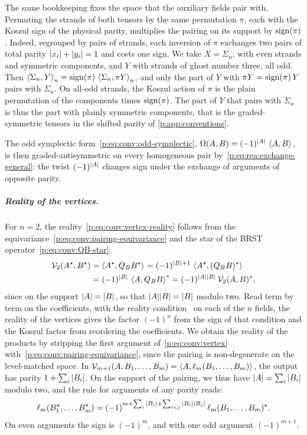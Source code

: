 The same bookkeeping fixes the space that the auxiliary fields pair with.
Permuting the strands of both tensors by the same permutation $\pi$, each with the Koszul sign of the physical parity, multiplies the pairing on its support by $\sign(\pi)$.
Indeed, regrouped by pairs of strands, each inversion of $\pi$ exchanges two pairs of total parity $\abs{x_i} + \abs{y_i} = 1$ and costs one sign.
We take $X = \Sigma_n$, with even strands and symmetric components, and $Y$ with strands of ghost number three, all odd.
Then $\pair[n]{\Sigma_n}{Y} = \sign(\pi) \, \pair[n]{\Sigma_n}{\pi Y}$, and only the part of $Y$ with $\pi Y = \sign(\pi) \, Y$ pairs with $\Sigma_n$.
On all-odd strands, the Koszul action of $\pi$ is the plain permutation of the components times $\sign(\pi)$.
The part of $Y$ that pairs with $\Sigma_n$ is thus the part with plainly symmetric components, that is the graded-symmetric tensors in the shifted parity of \cref{p:app:conventions}.

The odd symplectic form~\eqref{p:eq:conv:odd-symplectic}, $\Omega(A, B) = (-1)^{\abs{A}} \, \pair{A}{B}$, is then graded-antisymmetric on every homogeneous pair by~\eqref{p:eq:rea:exchange-general}: the twist $(-1)^{\abs{A}}$ changes sign under the exchange of arguments of opposite parity.


\subparagraph{Reality of the vertices.}

For $n = 2$, the reality~\eqref{p:eq:conv:vertex-reality} follows from the equivariance~\eqref{p:eq:conv:pairing-equivariance} and the star of the BRST operator~\eqref{p:eq:conv:QB-star}:
\begin{equation}
  \label{p:eq:rea:V2-star}
  \begin{aligned}
    \vertex{2}(A^\star, B^\star)
      &
      = \pair{A^\star}{Q_B B^\star}
      = (-1)^{\abs{B} + 1} \, \pair{A^\star}{(Q_B B)^\star}
    \\
      &
      = (-1)^{\abs{B}} \, \pair{A}{Q_B B}^*
      = (-1)^{\abs{A} \abs{B}} \, \vertex{2}(A, B)^*,
  \end{aligned}
\end{equation}
since on the support $\abs{A} = \abs{B}$, so that $\abs{A} \abs{B} = \abs{B}$ modulo two.
Read term by term on the coefficients, with the reality condition~\cite[eq.~(3.6)]{Zwiebach:1993:ClosedStringField} on each of the $n$ fields, the reality of the vertices gives the factor $(-1)^n$ from the sign of that condition and the Koszul factor from reordering the coefficients.
We obtain the reality of the products by stripping the first argument of~\eqref{p:eq:conv:vertex} with~\eqref{p:eq:conv:pairing-equivariance}, since the pairing is non-degenerate on the level-matched space.
In $\vertex{m + 1}(A, B_1, \ldots, B_m) = \pair{A}{\ell_m(B_1, \ldots, B_m)}$, the output has parity $1 + \sum_i \abs{B_i}$.
On the support of the pairing, we thus have $\abs{A} = \sum_i \abs{B_i}$ modulo two, and the rule for arguments of any parity reads:
\begin{equation}
\label{p:eq:rea:product-star}
\ell_m(B_1^\star, \ldots, B_m^\star)
  = (-1)^{m + \sum_i \abs{B_i} + \sum_{i < j} \abs{B_i} \abs{B_j}} \, \ell_m(B_1, \ldots, B_m)^\star.
\end{equation}
On even arguments the sign is $(-1)^m$, and with one odd argument $(-1)^{m + 1}$.

